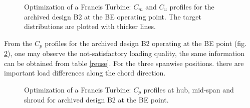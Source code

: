 \begin{figure}[h!]
\begin{minipage}[b]{1\linewidth}
 \centering
\end{minipage}
\caption{Optimization of a Francis Turbine: $C_m$ and $C_u$ profiles for the archived design B2 at the BE operating point. The target distributions are plotted with thicker lines.}
\label{Francis-B2-OUT}
\end{figure}

From the $C_p$ profiles for the archived design B2 operating at the BE point (fig. \ref{Francis-B2-LOAD}), one may observe the not-satisfactory loading quality, the same information can be obtained from table \ref{reuse}. For the three spanwise positions. there are important load differences along the chord direction. 

\begin{figure}[h!]
\begin{minipage}[b]{1\linewidth}
 \centering
\end{minipage}
\caption{Optimization of a Francis Turbine: $C_p$ profiles at hub, mid-span and shroud for archived design B2 at the BE point.}
\label{Francis-B2-LOAD}
\end{figure}

